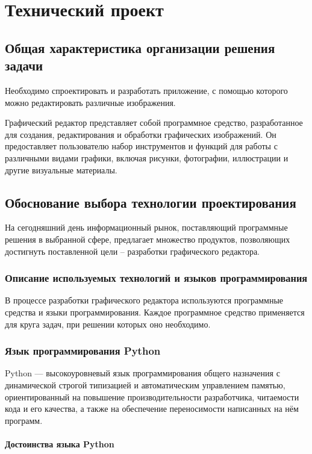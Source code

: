 \section{Технический проект}
\subsection{Общая характеристика организации решения задачи}

Необходимо спроектировать и разработать приложение, с помощью которого можно редактировать различные изображения.

Графический редактор представляет собой программное средство, разработанное для создания, редактирования и обработки графических изображений. Он предоставляет пользователю набор инструментов и функций для работы с различными видами графики, включая рисунки, фотографии, иллюстрации и другие визуальные материалы.

\subsection{Обоснование выбора технологии проектирования}

На сегодняшний день информационный рынок, поставляющий программные решения в выбранной сфере, предлагает множество продуктов, позволяющих достигнуть поставленной цели – разработки графического редактора.

\subsubsection{Описание используемых технологий и языков программирования}

В процессе разработки графического редактора используются программные средства и языки программирования. Каждое программное средство применяется для круга задач, при решении которых оно необходимо.

\subsubsection{Язык программирования Python}

Python — высокоуровневый язык программирования общего назначения с динамической строгой типизацией и автоматическим управлением памятью, ориентированный на повышение производительности разработчика, читаемости кода и его качества, а также на обеспечение переносимости написанных на нём программ.

\paragraph{Достоинства языка Python}

